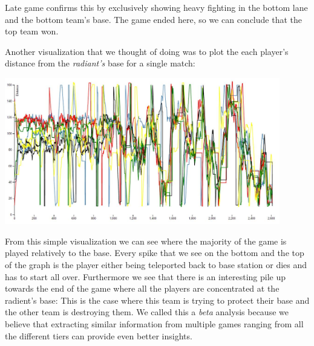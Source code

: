 Late game confirms this by exclusively showing heavy fighting in the bottom lane and the bottom team's base. The game ended here, so we can conclude that the top team won.


Another visualization that we thought of doing was to plot the each player's distance from the \textit{radiant's} base for a single match:

\includegraphics[width=0.9\textwidth]{distance}

From this simple visualization we can see where the majority of the game is played relatively to the base. Every spike that we see on the bottom and the top of the graph is the player either being teleported back to base station or dies and has to start all over. Furthermore we see that there is an interesting pile up towards the end of the game where all the players are concentrated at the radient's base: This is the case where this team is trying to protect their base and the other team is destroying them. We called this a \textit{beta} analysis because we believe that extracting similar information from multiple games ranging from all the different tiers can provide even better insights.

